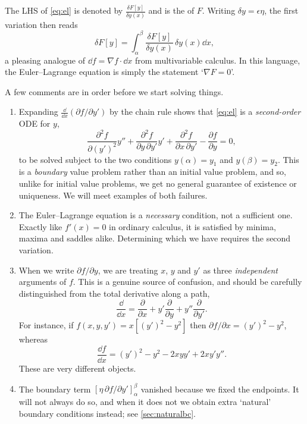 \begin{notation}
	The LHS of \eqref{eq:el} is denoted by $\displaystyle\frac{\delta F[y]}{\delta y(x)}$ and is the  of $F$. Writing $\delta y = \epsilon\eta$, the first variation then reads
	$$
	\delta F[y] = \int_\alpha^\beta \frac{\delta F[y]}{\delta y(x)}\,\delta y(x) \dd x,
	$$
	a pleasing analogue of $\dd f = \nabla f \cdot \dd x$ from multivariable calculus. In this language, the Euler--Lagrange equation is simply the statement `$\nabla F = 0$'.
\end{notation}

A few comments are in order before we start solving things.

\begin{remark}\leavevmode
	\begin{enumerate}[label=(\roman*)]
		\item Expanding $\frac{\dd}{\dd x}\left(\partial f/\partial y'\right)$ by the chain rule shows that \eqref{eq:el} is a \emph{second-order} ODE for $y$,
		$$
		\frac{\partial^2 f}{\partial (y')^2}y'' + \frac{\partial^2 f}{\partial y\, \partial y'}y' + \frac{\partial^2 f}{\partial x\, \partial y'} - \frac{\partial f}{\partial y} = 0,
		$$
		to be solved subject to the two conditions $y(\alpha) = y_1$ and $y(\beta) = y_2$. This is a \emph{boundary} value problem rather than an initial value problem, and so, unlike for initial value problems, we get no general guarantee of existence or uniqueness. We will meet examples of both failures.
		\item The Euler--Lagrange equation is a \emph{necessary} condition, not a sufficient one. Exactly like $f'(x) = 0$ in ordinary calculus, it is satisfied by minima, maxima and saddles alike. Determining which we have requires the second variation.
		\item When we write $\partial f/\partial y$, we are treating $x$, $y$ and $y'$ as three \emph{independent} arguments of $f$. This is a genuine source of confusion, and should be carefully distinguished from the total derivative along a path,
		$$
		\frac{\dd}{\dd x} = \frac{\partial}{\partial x} + y'\frac{\partial }{\partial y} + y''\frac{\partial}{\partial y'}.
		$$
		For instance, if $f(x, y, y') = x\left[(y')^2 - y^2\right]$ then $\partial f/\partial x = (y')^2 - y^2$, whereas
		$$
		\frac{\dd f}{\dd x} = (y')^2 - y^2 - 2xyy' + 2xy'y''.
		$$
		These are very different objects.
		\item The boundary term $\left[\eta\,\partial f/\partial y'\right]_\alpha^\beta$ vanished because we fixed the endpoints. It will not always do so, and when it does not we obtain extra `natural' boundary conditions instead; see \autoref{sec:naturalbc}.
	\end{enumerate}
\end{remark}

